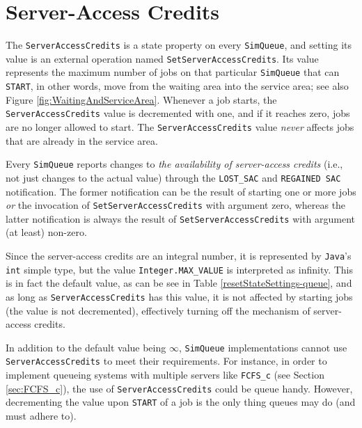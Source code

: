 \section{Server-Access Credits}
\label{sec:guided:sac}

The \lstinline|ServerAccessCredits|
  is a state property on every \lstinline|SimQueue|,
  and setting its value is an
  external operation
  named \lstinline|SetServerAccessCredits|.
Its value represents the maximum number of
  jobs on that particular \lstinline|SimQueue|
  that can \lstinline|START|,
  in other words,
  move from the waiting area into
  the service area;
  see also Figure \ref{fig:WaitingAndServiceArea}.
Whenever a job starts,
  the \lstinline|ServerAccessCredits| value
  is decremented with one,
  and if it reaches zero,
  jobs are no longer allowed to start.
The \lstinline|ServerAccessCredits| value
  {\em never\/}
  affects jobs that are already in the
  service area.

Every \lstinline|SimQueue| reports
  changes to {\em the availability of server-access credits\/}
  (i.e., not just changes to the actual value)
  through the \lstinline|LOST_SAC|
  and \lstinline|REGAINED SAC|
  notification.
The former notification can be the result of
  starting one or more jobs
  {\em or\/}
  the invocation of \lstinline|SetServerAccessCredits|
  with argument zero,
  whereas the latter notification is always
  the result of \lstinline|SetServerAccessCredits|
  with argument (at least) non-zero.

Since the server-access credits are an integral number,
  it is represented by \lstinline|Java|'s
  \lstinline|int| simple type,
  but the value
  \lstinline|Integer.MAX_VALUE|
  is interpreted as infinity.
This is in fact the default value,
  as can be see in Table \ref{resetStateSettings-queue},
  and as long as \lstinline|ServerAccessCredits|
  has this value,
  it is not affected by starting jobs
  (the value is not decremented),
  effectively turning off the mechanism of
  server-access credits.

In addition to the default value being $\infty$,
  \lstinline|SimQueue| implementations
  cannot use \lstinline|ServerAccessCredits|
  to meet their requirements.
For instance, in order to implement queueing
  systems with multiple servers like
  \lstinline|FCFS_c|
  (see Section \ref{sec:FCFS_c}),
  the use of
  \lstinline|ServerAccessCredits|
  could be queue handy.
However, decrementing the value upon \lstinline|START|
  of a job is the only thing queues may do
  (and must adhere to).

